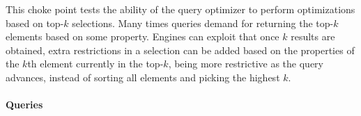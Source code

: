 

This choke point tests the ability of the query optimizer to perform optimizations based on top-$k$ selections. Many times queries demand for returning the top-$k$ elements based on some property.
Engines can exploit that once $k$ results are obtained, extra restrictions in a selection can be added based on the properties of the $k$th element currently in the top-$k$, being more restrictive as the query advances, instead of sorting all elements and picking the highest $k$.


\paragraph{Queries}
{\raggedright

}